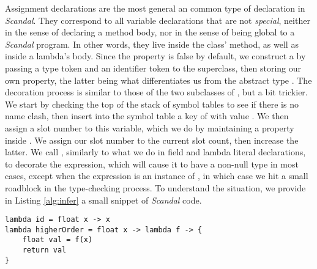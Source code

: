 Assignment declarations are the most general an common type of declaration in \emph{Scandal}. They correspond to all variable declarations that are not \emph{special}, neither in the sense of declaring a method body, nor in the sense of being global to a \emph{Scandal} program. In other words, they live inside the  class'  method, as well as inside a lambda's body. Since the  property is false by default, we construct a  by passing a type token and an identifier token to the superclass, then storing our own  property, the latter being what differentiates us from the abstract type . The decoration process is similar to those of the two subclasses of , but a bit trickier. We start by checking the top of the stack of symbol tables to see if there is no name clash, then insert into the symbol table a key of  with value . We then assign a slot number to this variable, which we do by maintaining a property  inside . We assign our slot number to the current slot count, then increase the latter. We call , similarly to what we do in field and lambda literal declarations, to decorate the expression, which will cause it to have a non-null type in most cases, except when the expression is an instance of , in which case we hit a small roadblock in the type-checking process. To understand the situation, we provide in Listing \ref{alg:infer} a small snippet of \emph{Scandal} code.

\begin{lstlisting}[emph={lambda,float,return},emphstyle={\textbf},caption={Type inference in \emph{Scandal}.},label={alg:infer}]
lambda id = float x -> x
lambda higherOrder = float x -> lambda f -> {
	float val = f(x)
	return val
}
\end{lstlisting}

